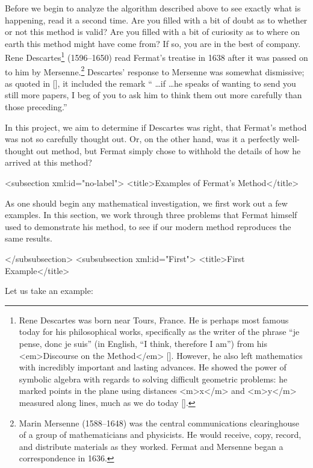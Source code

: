\begin{refsection}
Before we begin to analyze the algorithm described above to see
exactly what is happening, read it a second time.  Are you filled with
a bit of doubt as to whether or not this method is valid?  Are you
filled with a bit of curiosity as to where on earth this method might
have come from?  If so, you are in the best of company.  Rene
Descartes\footnote{Rene Descartes was born near Tours, France.  He is
  perhaps most famous today for his philosophical works, specifically
  as the writer of the phrase {``\sf je pense, donc je suis''} (in
  English, ``I think, therefore I am'') from his <em>Discourse on
    the Method</em> [\cite{Descartes}].  However, he also left mathematics
  with incredibly important and lasting advances.  He showed the power
  of symbolic algebra with regards to solving difficult geometric
  problems: he marked points in the plane using distances <m>x</m> and <m>y</m>
  measured along lines, much as we do today [\cite{Grabiner}].}
(1596--1650) read Fermat's treatise in 1638 after it was passed on to
him by Mersenne.\footnote{Marin Mersenne (1588--1648) was the central
  communications clearinghouse of a group of mathematicians and
  physicists. He would receive, copy, record, and distribute materials
  as they worked.  Fermat and Mersenne began a correspondence in
  1636.}  Descartes' response to Mersenne was somewhat dismissive; as
quoted in [\cite[p. 177]{FermatBio}], it included the remark ``{\sf
  \ldots if \ldots he speaks of wanting to send you still more papers,
  I beg of you to ask him to think them out more carefully than those
  preceding.}''

In this project, we aim to determine if Descartes was right, that
Fermat's method was not so carefully thought out.  Or, on the other
hand, was it a perfectly well-thought out method, but Fermat simply
chose to withhold the details of how he arrived at this method?

<subsection xml:id="no-label">
<title>Examples of Fermat's Method</title>


As one should begin any mathematical investigation, we first work out
a few examples.  In this section, we work through three problems that
Fermat himself used to demonstrate his method, to see if our modern
method reproduces the same results.




</subsubsection>
<subsubsection xml:id="First">
<title>First Example</title>




\begin{source}
Let us take an example: 


\end{source}
\end{refsection}
